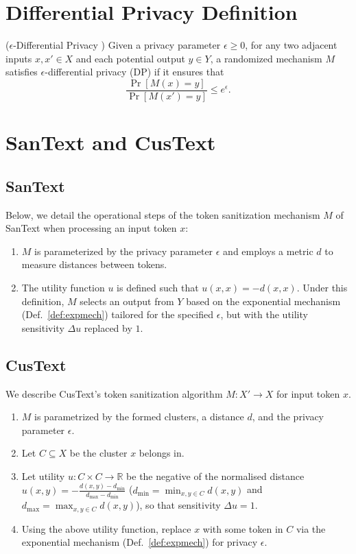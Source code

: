 \section{Differential Privacy Definition}


\begin{definition}(\(\epsilon\)-Differential Privacy \cite{dwork2006differential})
Given a privacy parameter \(\epsilon \geq 0\), for any two adjacent inputs \(x, x' \in X\) and each potential output \(y \in Y\), a randomized mechanism \(M\) satisfies \(\epsilon\)-differential privacy (DP) if it ensures that
\[
\frac{\Pr[M(x) = y]}{\Pr[M(x') = y]} \leq e^{\epsilon}.
\]
\end{definition}


\section{SanText and CusText}

\subsection{SanText}


Below, we detail the operational steps of the token sanitization mechanism \( M \) of SanText when processing an input token \( x \):

\begin{enumerate}
    \item \( M \) is parameterized by the privacy parameter \( \epsilon \) and employs a metric $d$ to measure distances between tokens.
    \item The utility function \( u \) is defined such that \( u(x, x) = -d(x, x) \). Under this definition, \( M \) selects an output from \( Y \) based on the exponential mechanism (Def.~\ref{def:expmech}) tailored for the specified \( \epsilon \), but with the utility sensitivity \( \Delta u \) replaced by \( 1 \).
\end{enumerate}

\subsection{CusText}

We describe CusText's token sanitization algorithm $M:X'\rightarrow X$ for input token $x$. 

\begin{enumerate}
    \item $M$ is parametrized by the formed clusters, a distance $d$, and the privacy parameter $\epsilon$.
    \item Let $C\subseteq X$ be the cluster $x$ belongs in.
    \item Let utility $u:C \times C \rightarrow \mathbb{R}$ be the negative of the normalised distance $u(x,y) = - \frac{d(x,y) - d_{\min}}{d_{\max} - d_{\min}}$ ($d_{\min} = \min_{x,y\in C}d(x,y)$ and $d_{\max}= \max_{x,y\in C}d(x,y)$), so that sensitivity $\Delta u = 1$. 
    \item Using the above utility function, replace $x$ with some token in $C$ via the exponential mechanism (Def.~\ref{def:expmech}) for privacy $\epsilon$.
\end{enumerate}

